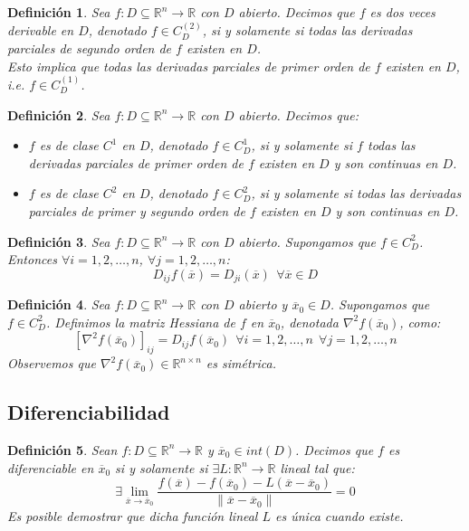 \documentclass[11pt]{report}
\newtheorem{definition}{Definición}[section]
\newcommand{\Rn}{\mathbb{R}^{n}}
\newcommand{\R}{\mathbb{R}}
\newcommand{\x}{\overline{x}}
\newcommand{\xz}{\overline{x}_{0}}
\newcommand{\Sn}{1,2,\ldots, n}
\begin{document}
\begin{definition}
Sea $f:D\subseteq\Rn\rightarrow\R$ con $D$ abierto. Decimos que $f$ es dos veces derivable en $D$, denotado $f\in C_{D}^{(2)}$, si y solamente si todas las derivadas parciales de segundo orden de $f$ existen en $D$.\\
Esto implica que todas las derivadas parciales de primer orden de $f$ existen en $D$, i.e. $f\in C_{D}^{(1)}$.
\end{definition}

\begin{definition}
Sea $f:D\subseteq\Rn\rightarrow\R$ con $D$ abierto. Decimos que:
\begin{itemize}
\item[(i)] $f$ es de clase $C^{1}$ en $D$, denotado $f\in C_{D}^{1}$, si y solamente si $f$ todas las derivadas parciales de primer orden de $f$ existen en $D$ y son continuas en $D$.
\item[(ii)] $f$ es de clase $C^{2}$ en $D$, denotado $f\in C_{D}^{2}$, si y solamente si todas las derivadas parciales de primer y segundo orden de $f$ existen en $D$ y son continuas en $D$.
\end{itemize}
\end{definition}

\begin{definition}
Sea $f:D\subseteq\Rn\rightarrow\R$ con $D$ abierto. Supongamos que $f\in C_{D}^{2}$. Entonces $\forall i=\Sn$, $\forall j=\Sn$:
$$D_{ij}f(\x)=D_{ji}(\x)\ \ \forall\x\in D$$
\end{definition}

\begin{definition}
Sea $f:D\subseteq\Rn\rightarrow\R$ con $D$ abierto y $\xz\in D$. Supongamos que $f\in C_{D}^{2}$. Definimos la matriz Hessiana de $f$ en $\xz$, denotada $\nabla^{2}f(\xz)$, como:
$$[\nabla^{2}f(\xz)]_{ij}=D_{ij}f(\xz)\ \ \forall i=\Sn\ \ \forall j=\Sn$$
Observemos que $\nabla^{2}f(\xz)\in\R^{n\times n}$ es simétrica.
\end{definition}

\subsection{Diferenciabilidad}
\begin{definition}
Sean $f:D\subseteq\Rn\rightarrow\R$ y $\xz\in int(D)$. Decimos que $f$ es diferenciable en $\xz$ si y solamente si $\exists L:\Rn\rightarrow\R$ lineal tal que:
$$\exists\lim_{\x\to\xz}\frac{f(\x)-f(\xz)-L(\x-\xz)}{\|\x-\xz\|}=0$$
Es posible demostrar que dicha función lineal $L$ es única cuando existe.
\end{definition}
\end{document}
